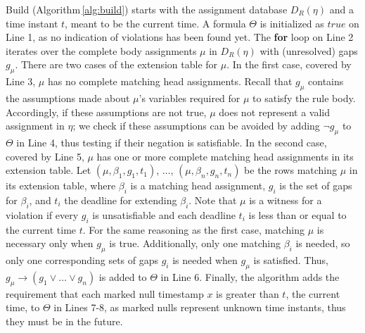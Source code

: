 {\sf Build} (Algorithm\,\ref{alg:build})
starts with the assignment database $D_{R}(\eta)$
and a time instant $t$, meant to be the current time.
A formula $\Theta$ is initialized as $true$
on Line 1,
as no indication of violations has been found yet.
The {\bf for} loop on Line 2 iterates
over the complete body assignments $\mu$ in $D_{R}(\eta)$
with (unresolved) gaps $g_\mu$.
There are two cases of the extension table for $\mu$.
In the first case, covered by Line 3,
$\mu$ has no complete matching head assignments.
Recall that $g_\mu$ contains the assumptions
made about $\mu$'s variables
required for $\mu$ to satisfy the rule body.
Accordingly,
if these assumptions are not true,
$\mu$ does not represent a valid assignment in $\eta$;
we check if these assumptions can be avoided
by adding $\neg g_\mu$ to $\Theta$ in Line 4,
thus testing if their negation is satisfiable.
In the second case, covered by Line 5,
$\mu$ has one or more complete matching head assignments
in its extension table.
Let $(\mu,\beta_1,g_1,t_1)$, $\dots$, $(\mu,\beta_n,g_n,t_n)$
be the rows matching $\mu$ in its extension table,
where $\beta_i$ is a matching head assignment,
$g_i$ is the set of gaps for $\beta_i$,
and $t_i$ the deadline for extending $\beta_i$.
Note that $\mu$ is a witness for a violation
if every $g_i$ is unsatisfiable
and each deadline $t_i$ is less than or equal to the current time $t$.
For the same reasoning as the first case,
matching $\mu$ is necessary only
when $g_\mu$ is true.
Additionally, only one matching $\beta_i$ is needed,
so only one corresponding sets of gaps $g_i$ is needed
when $g_\mu$ is satisfied.
Thus, $g_\mu\rightarrow(g_1 \lor\dots\lor g_n)$
is added to $\Theta$ in Line 6.
Finally, the algorithm adds the requirement
that each marked null timestamp $x$
is greater than $t$, the current time,
to $\Theta$ in Lines 7-8,
as marked nulls represent unknown time instants,
thus they must be in the future.

